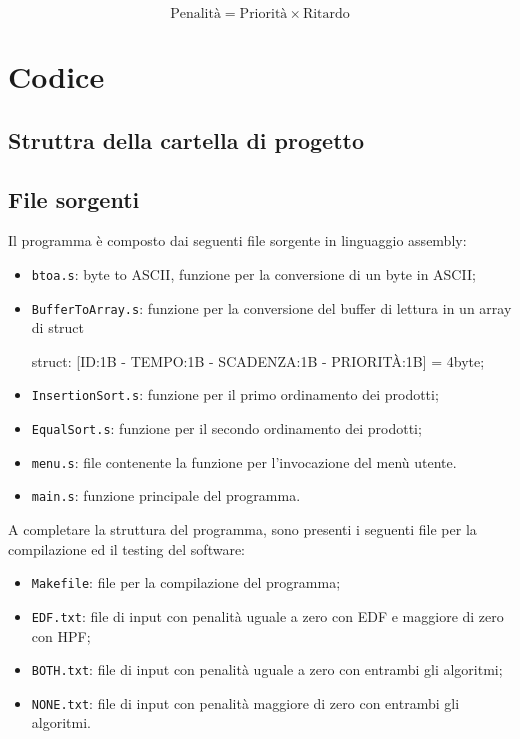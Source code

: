 \documentclass[a4paper]{report}
\begin{document}
\[
\text{Penalità} = \text{Priorità} \times \text{Ritardo}
\]

\newpage
\section{Codice}

\subsection{Struttra della cartella di progetto}


\subsection{File sorgenti}

Il programma è composto dai seguenti file sorgente in linguaggio assembly:
\begin{itemize}
  \item \texttt{btoa.s}: byte to ASCII, funzione per la conversione di un byte in ASCII;
  \item \texttt{BufferToArray.s}: funzione per la conversione del buffer di lettura in un array di struct \begin{myverbatim}
    struct: [ID:1B - TEMPO:1B - SCADENZA:1B - PRIORITÀ:1B] = 4byte;
  \end{myverbatim}
  \item \texttt{InsertionSort.s}: funzione per il primo ordinamento dei prodotti;
  \item \texttt{EqualSort.s}: funzione per il secondo ordinamento dei prodotti;
  \item \texttt{menu.s}: file contenente la funzione per l'invocazione del menù utente.
  \item \texttt{main.s}: funzione principale del programma.
\end{itemize}

A completare la struttura del programma, sono presenti i seguenti file per la compilazione ed il testing del software:
\begin{itemize}
  \item \texttt{Makefile}: file per la compilazione del programma;
  \item \texttt{EDF.txt}: file di input con penalità uguale a zero con EDF e maggiore di zero con HPF;
  \item \texttt{BOTH.txt}: file di input con penalità uguale a zero con entrambi gli algoritmi;
  \item \texttt{NONE.txt}: file di input con penalità maggiore di zero con entrambi gli algoritmi.
\end{itemize}
\end{document}
